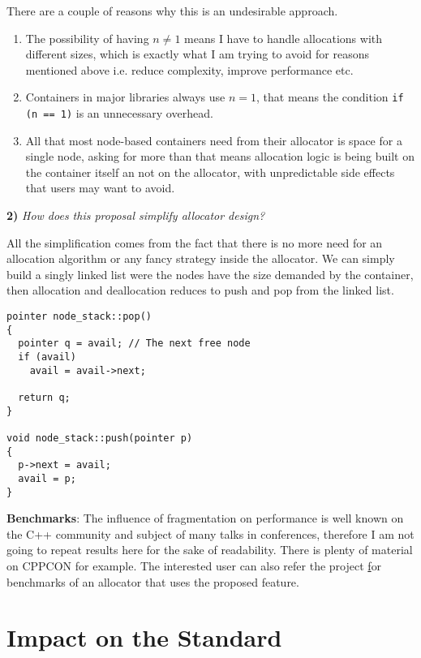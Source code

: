 \documentclass[11pt]{article}
\begin{document}
\noindent
There are a couple of reasons why this is an undesirable approach.

\begin{enumerate}
\item The possibility of having $n \ne 1$ means I have to handle
allocations with different sizes, which is exactly what I am
trying to avoid for reasons mentioned above i.e. reduce
complexity, improve performance etc.

\item Containers in major libraries always use $n = 1$, that
means the condition \texttt{if (n == 1)} is an unnecessary
overhead.

\item All that most node-based containers need from their allocator
is space for a single node, asking for more than that means
allocation logic is being built on the container itself an not on
the allocator, with unpredictable side effects that users may
want to avoid.
\end{enumerate}

\medskip
\noindent
{\bf 2) }{\it How does this proposal simplify allocator design?}

\medskip
\noindent
All the simplification comes from the fact that there is no more
need for an allocation algorithm or any fancy strategy inside the
allocator. We can simply build a singly linked list were the
nodes have the size demanded by the container, then allocation
and deallocation reduces to push and pop from the linked list.

\begin{lstlisting}
pointer node_stack::pop()
{
  pointer q = avail; // The next free node
  if (avail)
    avail = avail->next;

  return q;
}

void node_stack::push(pointer p)
{
  p->next = avail;
  avail = p;
}

\end{lstlisting}

\medskip
\noindent
{\bf Benchmarks}: The influence of fragmentation on performance
is well known on the C++ community and subject of many talks in
conferences, therefore I am not going to repeat results here for
the sake of readability. There is plenty of material on CPPCON
for example.  The interested user can also refer the project
\href{https://github.com/mzimbres/rtcpp}
for benchmarks of an allocator that uses the proposed feature.

\section{Impact on the Standard}
\end{document}
